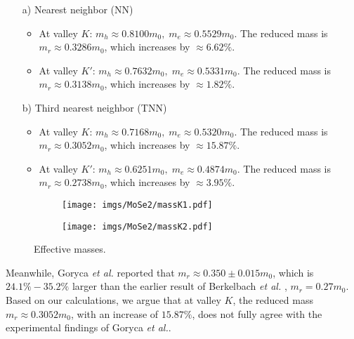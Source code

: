 \documentclass{article}
\begin{document}
\begin{itemize}
	\item[a)] Nearest neighbor (NN)
	\begin{itemize}
		\item At valley $K$: $m_{h} \approx 0.8100 m_{0},\; m_{e} \approx 0.5529 m_{0}$.  
		The reduced mass is $m_{r} \approx 0.3286 m_{0}$, which increases by $\approx 6.62\%$. 
		
		\item At valley $K'$: $m_{h} \approx 0.7632 m_{0},\; m_{e} \approx 0.5331 m_{0}$.  
		The reduced mass is $m_{r} \approx 0.3138 m_{0}$, which increases by $\approx 1.82\%$. 
	\end{itemize}
	\item[b)] Third nearest neighbor (TNN)
	\begin{itemize}
		\item At valley $K$: $m_{h} \approx 0.7168 m_{0},\; m_{e} \approx 0.5320 m_{0}$.  
		The reduced mass is $m_{r} \approx 0.3052 m_{0}$, which increases by $\approx 15.87\%$. 
		
		\item At valley $K'$: $m_{h} \approx 0.6251 m_{0},\; m_{e} \approx 0.4874 m_{0}$.  
		The reduced mass is $m_{r} \approx 0.2738 m_{0}$, which increases by $\approx 3.95\%$. 
	\end{itemize}
\end{itemize}

\begin{figure}[htb]
	\begin{subfigure}{0.495\textwidth}
		\centering
		\texttt{[image: imgs/MoSe2/massK1.pdf]}
	\end{subfigure}
	\begin{subfigure}{0.495\textwidth}
		\centering
		\texttt{[image: imgs/MoSe2/massK2.pdf]}
	\end{subfigure}
	\caption{Effective masses.}
\end{figure}

Meanwhile, Goryca \textit{et al.} \cite{goryca2019} reported that $m_{r} \approx 0.350 \pm 0.015 m_{0}$, which is $24.1\%-35.2\%$ larger than the earlier result of Berkelbach \textit{et al.} \cite{berkelbach2013}, $m_{r} = 0.27 m_{0}$.  
Based on our calculations, we argue that at valley $K$, the reduced mass $m_{r} \approx 0.3052 m_{0}$, with an increase of $15.87\%$, does not fully agree with the experimental findings of Goryca \textit{et al.}.
\end{document}
